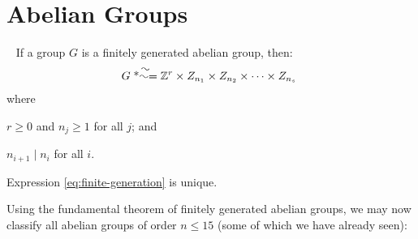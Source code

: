 \section{Abelian Groups}

\begin{theorem}~\label{thm:ftfgag}
  If a group $G$ is a finitely generated abelian group, then:
  \begin{align}
    G \isom \Z^r \times Z_{n_1} \times Z_{n_2} \times \cdots \times Z_{n_s}
    ~\label{eq:finite-generation}
  \end{align}
  where
  \begin{enumalph}
    \item $r \ge 0$ and $n_j \ge 1$ for all $j$; and
    \item $n_{i+1} \mid n_i$ for all $i$.
    \item Expression \ref{eq:finite-generation} is unique.
  \end{enumalph}
\end{theorem}

Using the fundamental theorem of finitely generated abelian groups,
we may now classify all abelian groups of order $n \le 15$
(some of which we have already seen):

